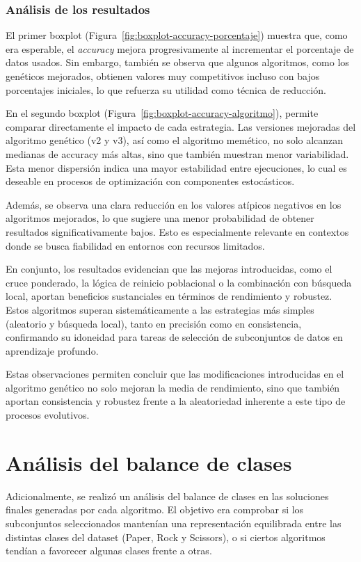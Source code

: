 \subsubsection{Análisis de los resultados}\label{sec:analisis-de-los-resultados}

El primer boxplot (Figura~\ref{fig:boxplot-accuracy-porcentaje}) muestra que, como era esperable,
el \textit{accuracy} mejora progresivamente al incrementar el porcentaje de datos usados.
Sin embargo, también se observa que algunos algoritmos, como los genéticos mejorados, obtienen valores muy competitivos
incluso con bajos porcentajes iniciales, lo que refuerza su utilidad como técnica de reducción.


En el segundo boxplot (Figura~\ref{fig:boxplot-accuracy-algoritmo}), permite comparar directamente el impacto de cada estrategia.
Las versiones mejoradas del algoritmo genético (v2 y v3), así como el algoritmo memético,
no solo alcanzan medianas de accuracy más altas, sino que también muestran menor variabilidad.
Esta menor dispersión indica una mayor estabilidad entre ejecuciones, lo cual es deseable en procesos
de optimización con componentes estocásticos.


Además, se observa una clara reducción en los valores atípicos negativos en los algoritmos mejorados, lo que sugiere una menor
probabilidad de obtener resultados significativamente bajos.
Esto es especialmente relevante en contextos donde se busca fiabilidad en entornos con recursos limitados.


En conjunto, los resultados evidencian que las mejoras introducidas, como el cruce ponderado, la lógica de reinicio poblacional
o la combinación con búsqueda local, aportan beneficios sustanciales en términos de rendimiento y robustez.
Estos algoritmos superan sistemáticamente a las estrategias más simples (aleatorio y búsqueda local), tanto en
precisión como en consistencia, confirmando su idoneidad para tareas de selección de subconjuntos de datos en aprendizaje profundo.


Estas observaciones permiten concluir que las modificaciones introducidas en el algoritmo genético no solo mejoran la media de rendimiento,
sino que también aportan consistencia y robustez frente a la aleatoriedad inherente a este tipo de procesos evolutivos.


\section{Análisis del balance de clases}\label{sec:analisis-del-balance-de-clases}
Adicionalmente, se realizó un análisis del balance de clases en las soluciones finales generadas por cada algoritmo.
El objetivo era comprobar si los subconjuntos seleccionados mantenían una representación equilibrada entre las
distintas clases del dataset (Paper, Rock y Scissors), o si ciertos algoritmos tendían a favorecer algunas clases frente a otras.


